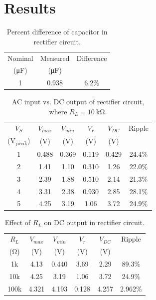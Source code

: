 \documentclass{article}
\begin{document}
\section{Results}
\label{sec:results}

\begin{table}[hbtp]
  \centering
  \begin{tabular}{ccc}
    Nominal & Measured & Difference \\
    (\si{\micro\farad}) & (\si{\micro\farad}) & \\
    \hline
    1 & 0.938 & 6.2\% \\
  \end{tabular}
  \caption{\label{tab:cap} Percent difference of capacitor in rectifier circuit.}
\end{table}

\begin{table}[hbtp]
  \centering
  \begin{tabular}{cccccc}
    $V_S$ & $V_{max}$ & $V_{min}$ & $V_r$ & $V_{DC}$ & Ripple \\
    (\si{V_{peak}}) & (\si{V}) & (\si{V}) & (\si{V}) & (\si{V}) & \\
    \hline
    1 & 0.488 & 0.369 & 0.119 & 0.429 & 24.4\% \\
    2 & 1.41 & 1.10 & 0.310 & 1.26 & 22.0\% \\
    3 & 2.39 & 1.88 & 0.510 & 2.14 & 21.3\% \\
    4 & 3.31 & 2.38 & 0.930 & 2.85 & 28.1\% \\
    5 & 4.25 & 3.19 & 1.06 & 3.72 & 24.9\% \\
  \end{tabular}
  \caption{\label{tab:rect_vp_vdc} AC input vs. DC output of rectifier circuit, where $R_L=\SI{10}{\kilo\ohm}$.}
\end{table}

\begin{table}[hbtp]
  \centering
  \begin{tabular}{cccccc}
    $R_L$ & $V_{max}$ & $V_{min}$ & $V_r$ & $V_{DC}$ & Ripple \\
    (\si{\ohm}) & (\si{V}) & (\si{V}) & (\si{V}) & (\si{V}) & \\
    \hline
    1k & 4.13 & 0.440 & 3.69 & 2.29 & 89.3\% \\
    10k & 4.25 & 3.19 & 1.06 & 3.72 & 24.9\% \\
    100k & 4.321 & 4.193 & 0.128 & 4.257 & 2.962\% \\
  \end{tabular}
  \caption{\label{tab:load_v_ripple} Effect of $R_L$ on DC output in rectifier circuit.}
\end{table}
\end{document}

